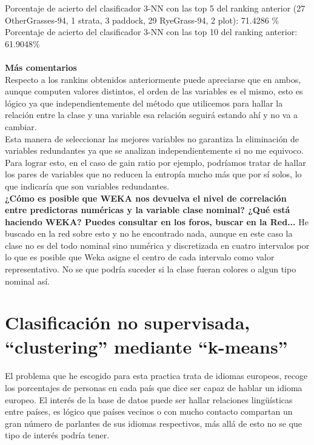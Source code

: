\documentclass[es]{ifirak}
\begin{document}
Porcentaje de acierto del clasificador 3-NN con las top 5 del ranking anterior (27 OtherGrasses-94, 1 strata, 3 paddock, 29 RyeGrass-94, 2 plot): 71.4286 \%\\

Porcentaje de acierto del clasificador 3-NN con las top 10 del ranking anterior: 61.9048\%\\

\paragraph{}
\textbf{Más comentarios}\\

Respecto a los rankins obtenidos anteriormente puede apreciarse que en ambos, aunque computen valores distintos, el orden de las variables es el mismo, esto es lógico ya que independientemente del método que utilicemos para hallar la relación entre la clase y una variable esa relación seguirá estando ahí y no va a cambiar.\\

Esta manera de seleccionar las mejores variables no garantiza la eliminación de variables redundantes ya que se analizan independientemente si no me equivoco. Para lograr esto, en el caso de gain ratio por ejemplo, podríamos tratar de hallar los pares de variables que no reducen la entropía mucho más que por sí solos, lo que indicaría que son variables redundantes.\\


\textbf{¿Cómo es posible que WEKA nos devuelva el nivel de correlación entre predictoras numéricas y la variable clase nominal? ¿Qué está haciendo WEKA? Puedes consultar en los foros, buscar en la Red...}
He buscado en la red sobre esto y no he encontrado nada, aunque en este caso la clase no es del todo nominal sino numérica y discretizada en cuatro intervalos por lo que es posible que Weka asigne el centro de cada intervalo como valor representativo. No se que podría suceder si la clase fueran colores o algun tipo nominal así.

\section{Clasificación no supervisada, “clustering” mediante “k-means”}

\paragraph{}
El problema que he escogido para esta practica trata de idiomas europeos, recoge los porcentajes de personas en cada país que dice ser capaz de hablar un idioma europeo. El interés de la base de datos puede ser hallar relaciones lingüísticas entre países, es lógico que países vecinos o con mucho contacto compartan un gran número de parlantes de sus idiomas respectivos, más allá de esto no se que tipo de interés podría tener.\\
\end{document}
